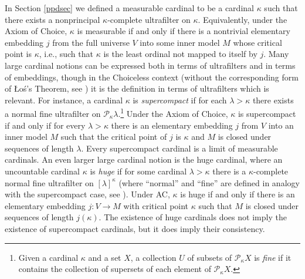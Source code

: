 \documentclass{book}%
\begin{document}
In Section \ref{ppdsec} we defined a measurable cardinal to be a cardinal $\kappa$ such that
there exists a nonprincipal $\kappa$-complete ultrafilter on $\kappa$. Equivalently, under
the Axiom of Choice, $\kappa$ is measurable if and only if there is a nontrivial elementary
embedding $j$ from the full universe $V$ into some inner model $M$ whose critical
point is $\kappa$, i.e., such that $\kappa$ is the least ordinal
not mapped to itself by $j$. Many large cardinal
notions can be expressed both in terms of ultrafilters and in terms of embeddings, though in the Choiceless context (without the corresponding form of {\L}o\'s's Theorem, see \cite[p.~159]{Jech:settheory}) it is the definition in terms of ultrafilters which is relevant. For instance, a
cardinal $\kappa$ is \emph{supercompact}
if for each $\lambda > \kappa$ there exists a normal fine ultrafilter on
$\mathcal{P}_{\kappa} \lambda$.\footnote{Given a cardinal $\kappa$ and a set $X$, a collection $U$ of subsets of $\mathcal{P}_{\kappa} X$
is \emph{fine} if it contains the collection of supersets of each element of $\mathcal{P}_{\kappa} X$.} Under the Axiom of Choice, $\kappa$ is supercompact if and only if for every
$\lambda > \kappa$ there is an elementary embedding $j$ from $V$ into an inner model $M$ such that the critical point of $j$ is $\kappa$ and
$M$ is closed under sequences of length $\lambda$. Every supercompact cardinal is a limit of measurable cardinals. An even
larger large cardinal notion is the huge cardinal, where an uncountable cardinal $\kappa$ is \emph{huge}
if for some cardinal $\lambda > \kappa$ there is a $\kappa$-complete normal fine ultrafilter on $[\lambda]^{\kappa}$ (where ``normal'' and ``fine'' are defined in analogy with the supercompact case, see \cite[p.~331]{Kanamori}). Under AC,
$\kappa$ is huge if and only if there is an elementary embedding $j \colon V \to M$ with critical point $\kappa$ such that
$M$ is closed under sequences of length $j(\kappa)$. The existence of huge cardinals does not imply the existence
of supercompact cardinals, but it does imply their consistency.
\end{document}
